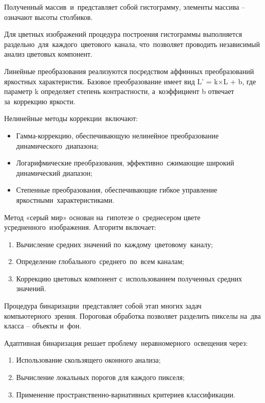 \documentclass{ou}
\begin{document}
Полученный массив~и~представляет собой гистограмму, элементы массива -- означают высоты столбиков.

Для цветных изображений процедура построения гистограммы выполняется раздельно~для~каждого~цветового~канала, что~позволяет проводить независимый анализ цветовых компонент.

Линейные преобразования реализуются посредством аффинных преобразований яркостных характеристик. Базовое преобразование имеет вид L' = k×L + b, где параметр k определяет степень контрастности, а~коэффициент b отвечает за~коррекцию яркости.

Нелинейные методы коррекции~включают:
\begin{itemize}[label=-, leftmargin=0em, itemindent=3.35em, nosep]
\item Гамма-коррекцию, обеспечивающую нелинейное преобразование динамического~диапазона;
\item Логарифмические преобразования, эффективно~сжимающие широкий динамический диапазон;
\item Степенные преобразования, обеспечивающие гибкое управление яркостными~характеристиками\cite{cyberleninka}.
\end{itemize}

Метод «серый мир» основан на~гипотезе о~среднесером цвете усредненного~изображения. Алгоритм включает:
\begin{enumerate}[leftmargin=0em, itemindent=3.75em, nosep, label=\arabic*)]
\item Вычисление средних значений по~каждому~цветовому~каналу;
\item Определение глобального~среднего~по~всем каналам;
\item Коррекцию цветовых компонент с~использованием полученных средних значений\cite{Modern_Research_and_Innovations}.
\end{enumerate}

Процедура бинаризации~представляет собой этап многих задач компьютерного~зрения. Пороговая обработка позволяет разделить пикселы на~два класса -- объекты и~фон.

Адаптивная бинаризация решает проблему~неравномерного~освещения через:
\begin{enumerate}[leftmargin=0em, itemindent=3.75em, nosep, label=\arabic*)]
\item Использование скользящего оконного анализа;
\item Вычисление локальных порогов для каждого пикселя;
\item Применение пространственно-вариативных критериев классификации\cite{Department_of_Nanosystems_and_Optotechnology2022}.
\end{enumerate}
\end{document}
